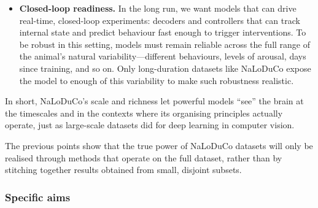 \begin{itemize}
  \item \textbf{Closed-loop readiness.}
  In the long run, we want models that can drive real-time, closed-loop experiments:
  decoders and controllers that can track internal state and predict behaviour fast enough
  to trigger interventions. To be robust in this setting, models must remain reliable across
  the full range of the animal's natural variability---different behaviours, levels of arousal,
  days since training, and so on. Only long-duration datasets like NaLoDuCo expose the model
  to enough of this variability to make such robustness realistic.
\end{itemize}

In short, NaLoDuCo's scale and richness let powerful models ``see'' the brain
at the timescales and in the contexts where its organising principles actually
operate, just as large-scale datasets did for deep learning in computer vision.

The previous points show that the true power of NaLoDuCo datasets will only be
realised through methods that operate on the full dataset, rather than by
stitching together results obtained from small, disjoint subsets.

\subsubsection{Specific aims}

